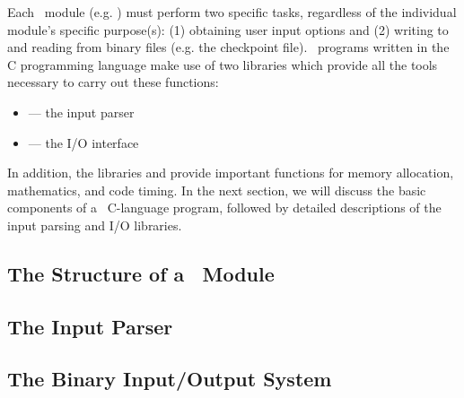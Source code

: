 %
%
%
%

Each \PSIthree\ module (e.g. \PSIcscf) must perform two specific
tasks, regardless of the individual module's specific purpose(s): (1)
obtaining user input options and (2) writing to and reading from
binary files (e.g. the checkpoint file).  \PSIthree\ programs written
in the C programming language make use of two libraries which
provide all the tools necessary to carry out these functions:
\begin{itemize}
\item {} --- the input parser
\item {} --- the I/O interface
\end{itemize}
In addition, the libraries  and 
provide important functions for memory allocation, mathematics, and
code timing.  In the next section, we will discuss the basic
components of a \PSIthree\ C-language program, followed by detailed
descriptions of the input parsing and I/O libraries.

\subsection{The Structure of a \PSIthree\ Module}\label{PSI_Module}


\subsection{The Input Parser}\label{C_IP}


\subsection{The Binary Input/Output System}\label{C_IO_New}


%


